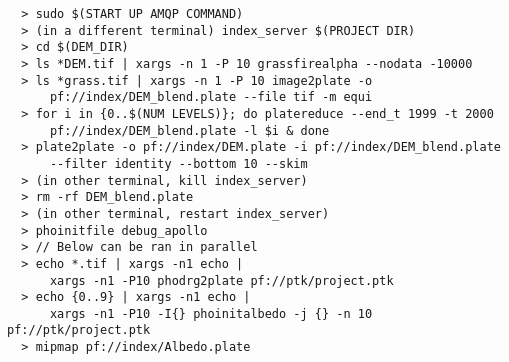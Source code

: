 \begin{verbatim}
  > sudo $(START UP AMQP COMMAND)
  > (in a different terminal) index_server $(PROJECT DIR)
  > cd $(DEM_DIR)
  > ls *DEM.tif | xargs -n 1 -P 10 grassfirealpha --nodata -10000
  > ls *grass.tif | xargs -n 1 -P 10 image2plate -o
      pf://index/DEM_blend.plate --file tif -m equi
  > for i in {0..$(NUM LEVELS)}; do platereduce --end_t 1999 -t 2000
      pf://index/DEM_blend.plate -l $i & done
  > plate2plate -o pf://index/DEM.plate -i pf://index/DEM_blend.plate
      --filter identity --bottom 10 --skim
  > (in other terminal, kill index_server)
  > rm -rf DEM_blend.plate
  > (in other terminal, restart index_server)
  > phoinitfile debug_apollo
  > // Below can be ran in parallel
  > echo *.tif | xargs -n1 echo |
      xargs -n1 -P10 phodrg2plate pf://ptk/project.ptk
  > echo {0..9} | xargs -n1 echo |
      xargs -n1 -P10 -I{} phoinitalbedo -j {} -n 10 pf://ptk/project.ptk
  > mipmap pf://index/Albedo.plate
\end{verbatim}
